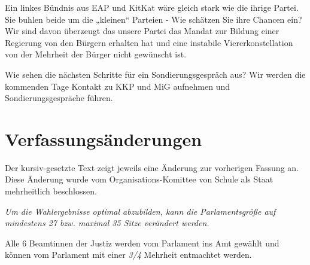 \documentclass{sasbase}
\begin{document}
\begin{question}{Ein linkes Bündnis aus EAP und KitKat wäre gleich stark wie die ihrige Partei. Sie buhlen beide um die „kleinen“ Parteien - Wie schätzen Sie ihre Chancen ein?}
    Wir sind davon überzeugt das unsere Partei das Mandat zur Bildung einer Regierung von den Bürgern erhalten hat und eine instabile Viererkonstellation von der 
    Mehrheit der Bürger nicht gewünscht ist. 
\end{question}

\begin{question}{Wie sehen die nächsten Schritte für ein Sondierungsgespräch aus?}
    Wir werden die kommenden Tage Kontakt zu KKP und MiG aufnehmen und Sondierungsgespräche führen.
\end{question}

\section{Verfassungsänderungen}
Der kursiv-gesetzte Text zeigt jeweils eine Änderung zur vorherigen Fassung an. Diese Änderung wurde vom Organisations-Komittee von Schule als Staat mehrheitlich beschlossen.
    \setcounter{articleno}{18}
    \begin{article}[Wahlrecht]
        \setcounter{enumi}{5}
    \item \textit{Um die Wahlergebnisse optimal abzubilden, kann die Parlamentsgröße auf mindestens 27 bzw. maximal 35 Sitze verändert werden.}
    \end{article}
    \setcounter{articleno}{31}
    \begin{article}
    \item Alle 6 Beamtinnen der Justiz werden vom Parlament ins Amt gewählt und können vom Parlament mit einer \textit{3/4} Mehrheit entmachtet werden.
    \end{article}
\end{document}
